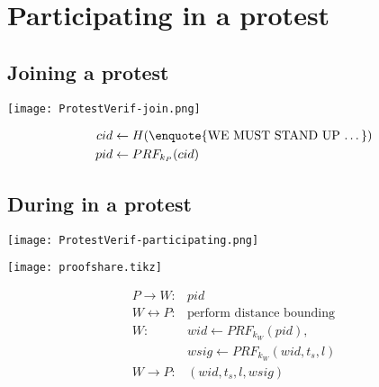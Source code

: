 \mode*

\section[Participating]{Participating in a protest}

\subsection{Joining a protest}

\begin{frame}
  \centering
  \texttt{[image: ProtestVerif-join.png]}
\end{frame}

\begin{frame}
  \begin{align*}
    cid &\gets H(\text{\enquote{WE MUST STAND UP \dots}}) \\
    pid &\gets PRF_{k_P}(cid)
  \end{align*}
\end{frame}

\subsection{During in a protest}

\begin{frame}
  \centering
  \texttt{[image: ProtestVerif-participating.png]}
\end{frame}

\begin{frame}
  \centering
  \texttt{[image: proofshare.tikz]}
\end{frame}

\begin{frame}
  \begin{minipage}{\linewidth}
    \begin{align*}
      P\to W\colon & pid \\
      W\leftrightarrow P\colon & \text{perform distance bounding} \\
      W\colon & wid\gets PRF_{k_W}(pid), \\
        & wsig\gets PRF_{k_W}(wid, t_s, l) \\
      W\to P\colon & (wid, t_s, l, wsig) \\
    \end{align*}
  \end{minipage}
\end{frame}

